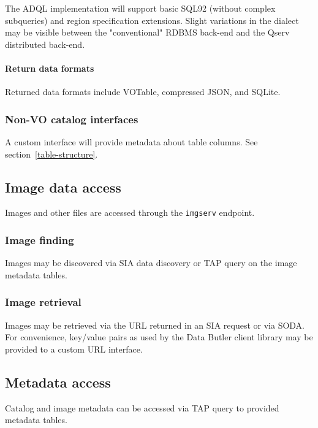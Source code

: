 The ADQL implementation will support basic SQL92 (without complex subqueries)
and region specification extensions.  Slight variations in the dialect may be
visible between the "conventional" RDBMS back-end and the Qserv distributed
back-end.

\paragraph{Return data formats}\label{return-data-formats}

Returned data formats include VOTable, compressed JSON, and SQLite.

\subsubsection{Non-VO catalog interfaces}\label{non-vo-catalog-interfaces}

A custom interface will provide metadata about table columns.  See section~\ref{table-structure}.

\subsection{Image data access}\label{image-data-access}

Images and other files are accessed through
the \texttt{imgserv} endpoint.

\subsubsection{Image finding}\label{image-finding}

Images may be discovered via SIA data discovery or TAP query on the image metadata tables.

\subsubsection{Image retrieval}\label{image-retrieval}

Images may be retrieved via the URL returned in an SIA request or via SODA.
For convenience, key/value pairs as used by the Data Butler client library may
be provided to a custom URL interface.

\subsection{Metadata access}\label{metadata-access}

Catalog and image metadata can be accessed via TAP query to provided
metadata tables.


